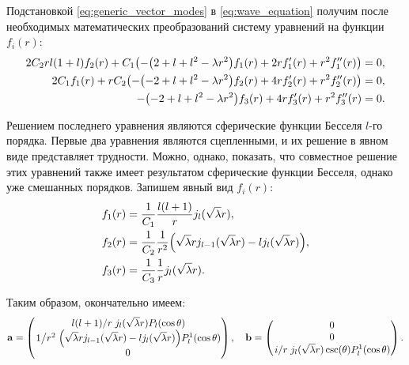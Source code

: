 \documentclass[12pt,a4paper]{article}
\begin{document}
        Подстановкой \autoref{eq:generic_vector_modes} в \autoref{eq:wave_equation} получим после необходимых математических преобразований систему уравнений на функции $f_i(r)$:
        \begin{equation}\begin{aligned}
            2 C_2 r l (1 + l) f_2(r) + C_1 \qty(
                - \qty(2 + l + l^2 - \lambda r^2) f_1(r) +
                2 r f_1'(r) + r^2 f_1''(r)
            ) &= 0, \\
            2 C_1 f_1(r) + r C_2 \qty(
                - \qty(-2 + l + l^2 - \lambda r^2) f_2(r) +
                4 r f_2'(r) + r^2 f_2''(r)
            ) &= 0, \\
            - \qty(-2 + l + l^2 - \lambda r^2) f_3(r) +
                4 r f_3'(r) + r^2 f_3''(r) &= 0.
        \end{aligned}\end{equation}

        Решением последнего уравнения являются сферические функции Бесселя $l$-го порядка. Первые два уравнения являются сцепленными, и их решение в явном виде представляет трудности. Можно, однако, показать, что совместное решение этих уравнений также имеет результатом сферические функции Бесселя, однако уже смешанных порядков. Запишем явный вид $f_i(r)$:
        \begin{equation}\begin{aligned}
            f_1(r) &= \frac{1}{C_1} \frac{l(l+1)}{r} j_l(\sqrt\lambda r), \\
            f_2(r) &= \frac{1}{C_2} \frac{1}{r^2} \qty(
                \sqrt\lambda r j_{l-1}(\sqrt\lambda r) -
                l j_l(\sqrt\lambda r)
            ), \\
            f_3(r) &= \frac{1}{C_3} \frac{1}{r} j_l(\sqrt\lambda r).
        \end{aligned}\end{equation}

        Таким образом, окончательно имеем:
        \begin{equation}
            \vb{a} = \begin{pmatrix}
                \flatfrac{l(l+1)}{r} j_l(\sqrt\lambda r) P_l(\cos\theta) \\
                \flatfrac{1}{r^2} \qty(
                    \sqrt\lambda r j_{l-1}(\sqrt\lambda r) -
                    l j_l(\sqrt\lambda r)
                ) P_l^1(\cos\theta) \\
                0
            \end{pmatrix} , \quad
            \vb{b} = \begin{pmatrix}
                0 \\
                0 \\
                \flatfrac{i}{r} j_l(\sqrt\lambda r) \csc(\theta) P_l^1(\cos\theta)
            \end{pmatrix} .
        \end{equation}
\end{document}

